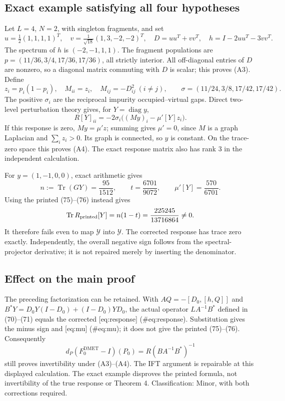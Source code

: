 \documentclass[10pt]{article}
\begin{document}
\subsection*{Exact example satisfying all four hypotheses}
Let \(L=4\), \(N=2\), with singleton fragments, and set \[u=\tfrac12(1,1,1,1)^T,\quad
 v=\tfrac1{\sqrt{18}}(1,3,-2,-2)^T,\quad
 D=uu^T+vv^T,\quad h=I-2uu^T-3vv^T.
 \tag{R2}\] The spectrum of \(h\) is \((-2,-1,1,1)\). The fragment populations are \(p=(11/36,3/4,17/36,17/36)\), all strictly interior. All off-diagonal entries of \(D\) are nonzero, so a diagonal matrix commuting with \(D\) is scalar; this proves (A3). Define \[z_i=p_i(1-p_i),\quad M_{ii}=z_i,\quad M_{ij}=-D_{ij}^2\ (i\ne j),
 \qquad \sigma=(11/24,3/8,17/42,17/42).\] The positive \(\sigma_i\) are the reciprocal impurity occupied–virtual gaps. Direct two-level perturbation theory gives, for \(Y=\operatorname{diag}y\), \[R[Y]_{ii}=-2\sigma_i\big((My)_i-\mu'[Y]z_i\big).
 \tag{R3}\] If this response is zero, \(My=\mu'z\); summing gives \(\mu'=0\), since \(M\) is a graph Laplacian and \(\sum_i z_i>0\). Its graph is connected, so \(y\) is constant. On the trace-zero space this proves (A4). The exact response matrix also has rank 3 in the independent calculation.\par
For \(y=(1,-1,0,0)\), exact arithmetic gives \[n:=\operatorname{Tr}(GY)=\frac{95}{1512},\qquad
 t=\frac{6701}{9072},\qquad
 \mu'[Y]=\frac{570}{6701}.\] Using the printed (75)–(76) instead gives \[\operatorname{Tr}R_{\rm printed}[Y]=n(1-t)
       =\frac{225245}{13716864}\ne0.\] It therefore fails even to map \(\mathcal Y\) into \(\mathcal Y\). The corrected response has trace zero exactly. Independently, the overall negative sign follows from the spectral-projector derivative; it is not repaired merely by inserting the denominator.\par
\subsection*{Effect on the main proof}
The preceding factorization can be retained. With \(A Q=-[D_0,[h,Q]]\) and \(B^*Y=D_0Y(I-D_0)+(I-D_0)YD_0\), the actual operator \(L A^{-1}B^*\) defined in (70)–(71) equals the corrected [eq:response] (\#eq:response). Substitution gives the minus sign and [eq:mu] (\#eq:mu); it does not give the printed (75)–(76). Consequently \[d_P(F^\mathrm{DMET}_0-I)(P_0)=R(BA^{-1}B^*)^{-1}\] still proves invertibility under (A3)–(A4). The IFT argument is repairable at this displayed calculation. The exact example disproves the printed formula, not invertibility of the true response or Theorem 4. Classification: Minor, with both corrections required.\par
\end{document}
